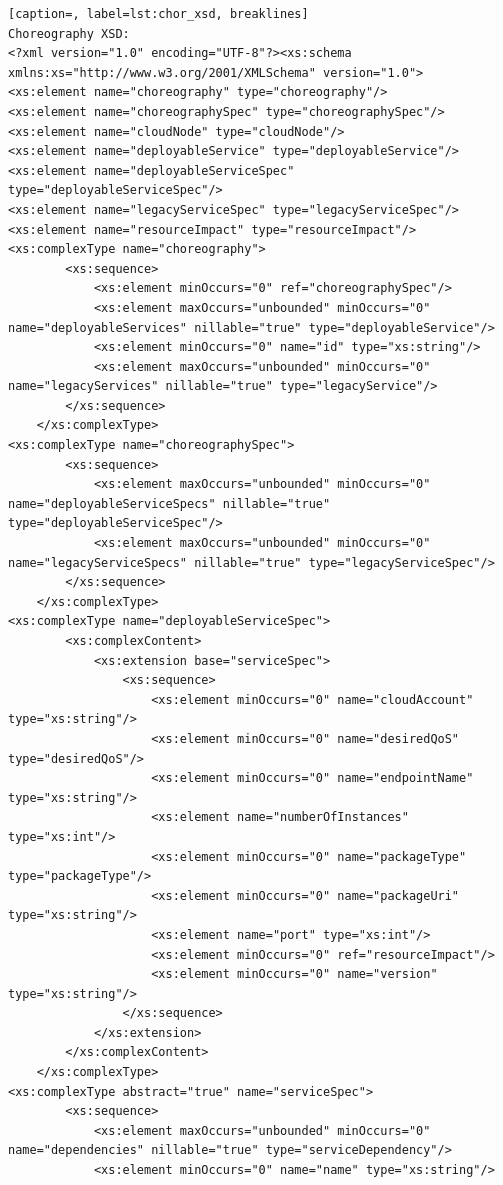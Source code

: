 {\begin{lstlisting}[caption=, label=lst:chor_xsd, breaklines]
Choreography XSD:
<?xml version="1.0" encoding="UTF-8"?><xs:schema xmlns:xs="http://www.w3.org/2001/XMLSchema" version="1.0">
<xs:element name="choreography" type="choreography"/>
<xs:element name="choreographySpec" type="choreographySpec"/>
<xs:element name="cloudNode" type="cloudNode"/>
<xs:element name="deployableService" type="deployableService"/>
<xs:element name="deployableServiceSpec" type="deployableServiceSpec"/>
<xs:element name="legacyServiceSpec" type="legacyServiceSpec"/>
<xs:element name="resourceImpact" type="resourceImpact"/>
<xs:complexType name="choreography">
        <xs:sequence>
            <xs:element minOccurs="0" ref="choreographySpec"/>
            <xs:element maxOccurs="unbounded" minOccurs="0" name="deployableServices" nillable="true" type="deployableService"/>
            <xs:element minOccurs="0" name="id" type="xs:string"/>
            <xs:element maxOccurs="unbounded" minOccurs="0" name="legacyServices" nillable="true" type="legacyService"/>
        </xs:sequence>
    </xs:complexType>
<xs:complexType name="choreographySpec">
        <xs:sequence>
            <xs:element maxOccurs="unbounded" minOccurs="0" name="deployableServiceSpecs" nillable="true" type="deployableServiceSpec"/>
            <xs:element maxOccurs="unbounded" minOccurs="0" name="legacyServiceSpecs" nillable="true" type="legacyServiceSpec"/>
        </xs:sequence>
    </xs:complexType>
<xs:complexType name="deployableServiceSpec">
        <xs:complexContent>
            <xs:extension base="serviceSpec">
                <xs:sequence>
                    <xs:element minOccurs="0" name="cloudAccount" type="xs:string"/>
                    <xs:element minOccurs="0" name="desiredQoS" type="desiredQoS"/>
                    <xs:element minOccurs="0" name="endpointName" type="xs:string"/>
                    <xs:element name="numberOfInstances" type="xs:int"/>
                    <xs:element minOccurs="0" name="packageType" type="packageType"/>
                    <xs:element minOccurs="0" name="packageUri" type="xs:string"/>
                    <xs:element name="port" type="xs:int"/>
                    <xs:element minOccurs="0" ref="resourceImpact"/>
                    <xs:element minOccurs="0" name="version" type="xs:string"/>
                </xs:sequence>
            </xs:extension>
        </xs:complexContent>
    </xs:complexType>
<xs:complexType abstract="true" name="serviceSpec">
        <xs:sequence>
            <xs:element maxOccurs="unbounded" minOccurs="0" name="dependencies" nillable="true" type="serviceDependency"/>
            <xs:element minOccurs="0" name="name" type="xs:string"/>

\end{lstlisting}}
